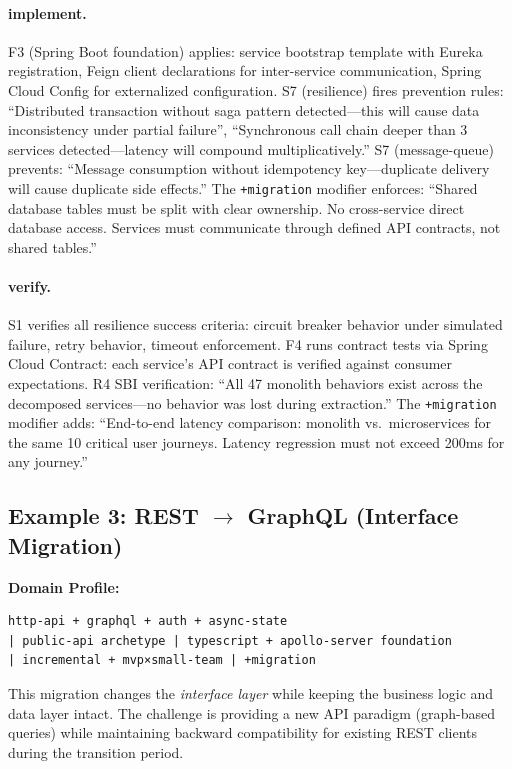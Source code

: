 \documentclass[11pt,a4paper,openright,twoside]{report}
\begin{document}
\paragraph{implement.}
F3 (Spring Boot foundation) applies: service bootstrap template with Eureka registration, Feign client declarations for inter-service communication, Spring Cloud Config for externalized configuration. S7 (resilience) fires prevention rules: ``Distributed transaction without saga pattern detected---this will cause data inconsistency under partial failure'', ``Synchronous call chain deeper than 3 services detected---latency will compound multiplicatively.'' S7 (message-queue) prevents: ``Message consumption without idempotency key---duplicate delivery will cause duplicate side effects.'' The \texttt{+migration} modifier enforces: ``Shared database tables must be split with clear ownership. No cross-service direct database access. Services must communicate through defined API contracts, not shared tables.''

\paragraph{verify.}
S1 verifies all resilience success criteria: circuit breaker behavior under simulated failure, retry behavior, timeout enforcement. F4 runs contract tests via Spring Cloud Contract: each service's API contract is verified against consumer expectations. R4 SBI verification: ``All 47 monolith behaviors exist across the decomposed services---no behavior was lost during extraction.'' The \texttt{+migration} modifier adds: ``End-to-end latency comparison: monolith vs.\ microservices for the same 10 critical user journeys. Latency regression must not exceed 200ms for any journey.''

\subsection{Example 3: REST $\to$ GraphQL (Interface Migration)}

\textbf{Domain Profile:}
\begin{verbatim}
http-api + graphql + auth + async-state
| public-api archetype | typescript + apollo-server foundation
| incremental + mvp×small-team | +migration
\end{verbatim}

This migration changes the \emph{interface layer} while keeping the business logic and data layer intact. The challenge is providing a new API paradigm (graph-based queries) while maintaining backward compatibility for existing REST clients during the transition period.
\end{document}
